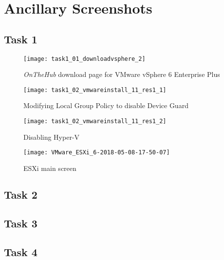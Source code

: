 \section{Ancillary Screenshots}
\label{app:ancillaryscreenshots}

\subsection{Task 1}

\begin{figure}[H]
  \centering
  \captionsetup{skip=2pt}
  \texttt{[image: task1\_01\_downloadvsphere\_2]}
  \caption{\textit{OnTheHub\textsuperscript{\textregistered}} download page for VMware vSphere 6 Enterprise Plus}
  \label{fig:task1:01_downloadvsphere}
\end{figure}

\begin{figure}[H]
  \centering
  \captionsetup{skip=2pt}
  \texttt{[image: task1\_02\_vmwareinstall\_11\_res1\_1]}
  \caption{Modifying Local Group Policy to disable Device Guard}
  \label{fig:task1:02_vmware_11_res1}
\end{figure}

\begin{figure}[H]
  \centering
  \captionsetup{skip=2pt}
  \texttt{[image: task1\_02\_vmwareinstall\_11\_res1\_2]}
  \caption{Disabling Hyper-V}
  \label{fig:task1:02_vmware_11_res2}
\end{figure}

\begin{figure}[H]
  \centering
  \captionsetup{skip=2pt}
  \texttt{[image: VMware\_ESXi\_6-2018-05-08-17-50-07]}
  \caption{ESXi main screen}
  \label{fig:task1:esxiinstall_up}
\end{figure}

\subsection{Task 2}

\subsection{Task 3}

\subsection{Task 4}
